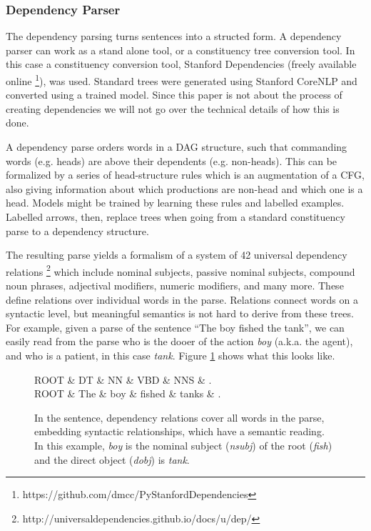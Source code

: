 \documentclass[twoside]{article}
\begin{document}
\subsubsection{Dependency Parser}

The dependency parsing turns sentences into a structed form.  A dependency parser can work as a stand alone tool, or a constituency tree conversion tool.  In this case a constituency conversion tool, Stanford Dependencies (freely available online \footnote{https://github.com/dmcc/PyStanfordDependencies}), was used.  Standard trees were generated using Stanford CoreNLP and converted using a trained model.  Since this paper is not about the process of creating dependencies we will not go over the technical details of how this is done.

A dependency parse orders words in a DAG structure, such that commanding words (e.g. heads) are above their dependents (e.g. non-heads).  This can be formalized by a series of head-structure rules which is an augmentation of a CFG, also giving information about which productions are non-head and which one is a head.  Models might be trained by learning these rules and labelled examples.  Labelled arrows, then, replace trees when going from a standard constituency parse to a dependency structure.

The resulting parse yields a formalism of a system of 42 universal dependency relations \footnote{http://universaldependencies.github.io/docs/u/dep/} which include nominal subjects, passive nominal subjects, compound noun phrases, adjectival modifiers, numeric modifiers, and many more.  These define relations over individual words in the parse.  Relations connect words on a syntactic level, but meaningful semantics is not hard to derive from these trees.  For example, given a parse of the sentence ``The boy fished the tank'', we can easily read from the parse who is the dooer of the action \textit{boy} (a.k.a. the agent), and who is a patient, in this case \textit{tank}.  Figure \ref{fig:deps} shows what this looks like.

\begin{figure}
\centering
\caption{In the sentence, dependency relations cover all words in the parse, embedding syntactic relationships, which have a semantic reading.  In this example, \textit{boy} is the nominal subject (\textit{nsubj}) of the root (\textit{fish}) and the direct object (\textit{dobj}) is \textit{tank}.} \label{fig:deps}
\begin{dependency}[edge horizontal padding=10pt]\begin{deptext}[column sep=0.3cm]ROOT \& DT \& NN \& VBD \& NNS \& .\\ROOT \& The \& boy \& fished \& tanks \& .\\\end{deptext}\end{dependency}
\end{figure}
\end{document}
